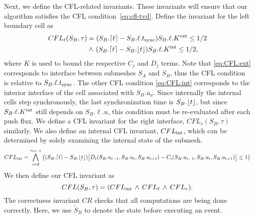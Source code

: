 Next, we define the CFL-related invariants. These invariants will ensure that our algorithm satisfies the CFL condition~\eqref{eq:cfl-tvd}. Define the invariant for the left boundary cell as
\begin{align}
CFL_{\ell}(S_B, \tau) &= ( S_B.\lceil t \rceil - S_B.\ell.t_{\text{sync}}) S_B.\ell.K^{\text{ext}} \le 1/2 \label{eq:CFL:ext}\\
& \land\, (S_B.\lceil t \rceil - S_B.\lfloor t \rfloor) S_B.\ell.K^{\text{int}} \le 1/2, \label{eq:CFL:int}
\end{align}
where $K$ is used to bound the respective $C_j$ and $D_j$ terms. Note that \eqref{eq:CFL:ext} corresponds to interface between submeshes $S_A$ and $S_B$, thus the CFL condition is relative to $S_B.\ell.t_{\text{sync}}$. The other CFL condition \eqref{eq:CFL:int} corresponds to the interior interface of the cell associated with $S_B.u_a$. Since internally the internal cells step synchronously, the last synchronization time is $S_B.\lfloor t \rfloor$, but since $S_B.\ell.K^{\text{int}}$ still depends on $S_B.\ell.u$, this condition must be re-evaluated after each push flux. We  define a CFL invariant for the right interface, $CFL_r(S_B, \tau)$ similarly. We also define an internal CFL invariant, $CFL_{\text{int}}$, which can be determined by solely examining the internal state of the submesh.
\begin{equation*}
    CFL_{\text{int}} = \bigwedge_{i=2}^{n_{el-1}} \big( (S_B.\lceil t \rceil - S_B.\lfloor t \rfloor) \big[D_i(S_B.u_{i-1},S_B.u_i, S_B.u_{i+1}) - C_i(S_B.u_{i-1},S_B.u_i,S_B.u_{i+1})\big] \le 1 \big)
\end{equation*}
We then define our CFL invariant as
\begin{equation}
CFL(S_B,\tau) =  (CFL_{\text{int}}\,\land\,CFL_{\ell}\,\land\,CFL_r). \label{eq:CFL:1}
\end{equation}
The correctness invariant $CR$ checks that all computations are being done correctly. Here, we use $\tilde{S}_B$ to denote the state before executing an event.
